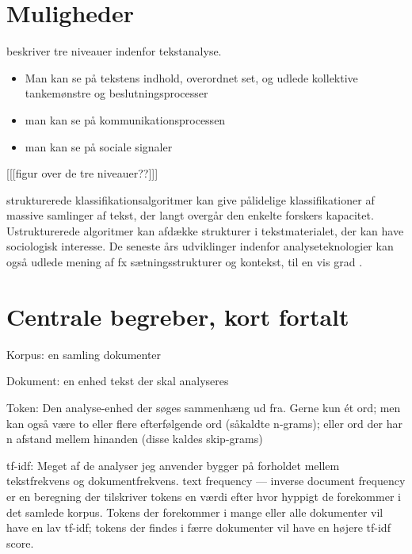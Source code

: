 \section{Muligheder}

\citeauthor{evansMachineTranslationMining2016} beskriver tre niveauer indenfor tekstanalyse.
\begin{itemize}
  \item
    Man kan se på tekstens indhold, overordnet set, og udlede kollektive tankemønstre og beslutningsprocesser
  \item
    man kan se på kommunikationsprocessen
  \item
    man kan se på sociale signaler
\end{itemize}

[[[figur over de tre niveauer??]]]

strukturerede klassifikationsalgoritmer kan give pålidelige klassifikationer af massive samlinger af tekst, der langt overgår den enkelte forskers kapacitet.
Ustrukturerede algoritmer kan afdække strukturer i tekstmaterialet, der kan have sociologisk interesse.
De seneste års udviklinger indenfor analyseteknologier kan også udlede mening af fx sætningsstrukturer og kontekst, til en vis grad \autocite[s. 22]{evansMachineTranslationMining2016}.

\section{Centrale begreber, kort fortalt}

Korpus: en samling dokumenter

Dokument: en enhed tekst der skal analyseres

Token: Den analyse-enhed der søges sammenhæng ud fra.
Gerne kun ét ord; men kan også være to eller flere efterfølgende ord (såkaldte n-grams); eller ord der har n afstand mellem hinanden (disse kaldes skip-grams)

tf-idf: Meget af de analyser jeg anvender bygger på forholdet mellem tekstfrekvens og dokumentfrekvens.
text frequency — inverse document frequency er en beregning der tilskriver tokens en værdi efter hvor hyppigt de forekommer i det samlede korpus.
Tokens der forekommer i mange eller alle dokumenter vil have en lav tf-idf; tokens der findes i færre dokumenter vil have en højere tf-idf score.


